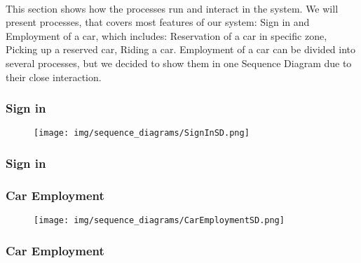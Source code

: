 	
		\paragraph{} This section shows how the processes run and interact in the system. 
		We will present processes, that covers most features of our system: Sign in and Employment of a car, which includes: Reservation of a car in specific zone, Picking up a reserved car, Riding a car. Employment of a car can be divided into several processes, but we decided to show them in one Sequence Diagram due to their close interaction.    

	\subsubsection{Sign in}	
		\begin{figure}[h]
			\texttt{[image: img/sequence\_diagrams/SignInSD.png]}
		\end{figure}
		
		\paragraph{}
			
	\subsubsection{Sign in}
	
	\subsubsection{Car Employment}	
		\begin{figure}[h]
			\texttt{[image: img/sequence\_diagrams/CarEmploymentSD.png]}
		\end{figure}
		
		\paragraph{}
		
	\subsubsection{Car Employment}